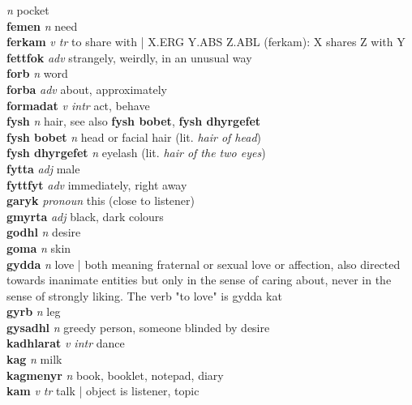   \emph{n} \textperiodcentered pocket\\\textbf{femen}   \emph{n} \textperiodcentered need\\\textbf{ferkam}   \emph{v tr} \textperiodcentered to share with | X.ERG Y.ABS Z.ABL (ferkam): X shares Z with Y\\\textbf{fettfok}   \emph{adv} \textperiodcentered strangely, weirdly, in an unusual way\\\textbf{forb}   \emph{n} \textperiodcentered word\\\textbf{forba}   \emph{adv} \textperiodcentered about, approximately\\\textbf{formadat}   \emph{v intr} \textperiodcentered act, behave\\\textbf{fysh}   \emph{n} \textperiodcentered hair, see also \textbf{fysh bobet}, \textbf{fysh dhyrgefet}\\\textbf{fysh bobet}   \emph{n} \textperiodcentered head or facial hair (lit. \emph{hair of head})\\\textbf{fysh dhyrgefet}   \emph{n} \textperiodcentered eyelash (lit. \emph{hair of the two eyes})\\\textbf{fytta}   \emph{adj} \textperiodcentered male\\\textbf{fyttfyt}   \emph{adv} \textperiodcentered immediately, right away\\\textbf{garyk}   \emph{pronoun} \textperiodcentered this (close to listener)\\\textbf{gmyrta}   \emph{adj} \textperiodcentered black, dark colours\\\textbf{godhl}   \emph{n} \textperiodcentered desire\\\textbf{goma}   \emph{n} \textperiodcentered skin\\\textbf{gydda}   \emph{n} \textperiodcentered love | both meaning fraternal or sexual love or affection, also directed towards inanimate entities but only in the sense of caring about, never in the sense of strongly liking. The verb "to love" is gydda kat\\\textbf{gyrb}   \emph{n} \textperiodcentered leg\\\textbf{gysadhl}   \emph{n} \textperiodcentered greedy person, someone blinded by desire\\\textbf{kadhlarat}   \emph{v intr} \textperiodcentered dance\\\textbf{kag}   \emph{n} \textperiodcentered milk\\\textbf{kagmenyr}   \emph{n} \textperiodcentered book, booklet, notepad, diary\\\textbf{kam}   \emph{v tr} \textperiodcentered talk | object is listener, topic 